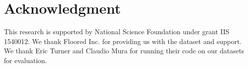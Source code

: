\documentclass[10pt,twocolumn,letterpaper]{article}
\begin{document}
  

%



\section*{Acknowledgment}
This research is supported by National Science Foundation under grant IIS 1540012. We thank Floored Inc. for providing us with the dataset and support. We thank Eric Turner and Claudio Mura for running their code on our datasets for evaluation.
\clearpage
{\small
	
	
}

	
\end{document}
